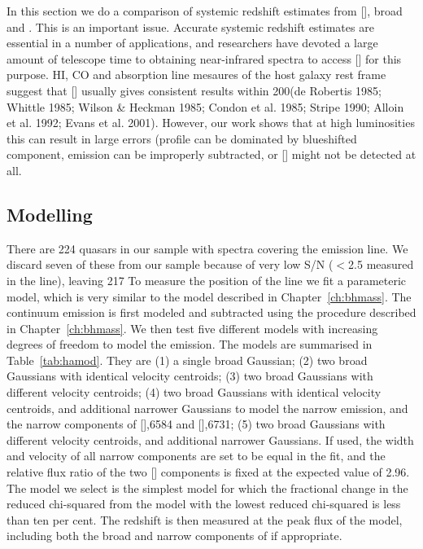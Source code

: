 In this section we do a comparison of systemic redshift estimates from [], broad \hb and \hans. 
This is an important issue. 
Accurate systemic redshift estimates are essential in a number of applications, and researchers have devoted a large amount of telescope time to obtaining near-infrared spectra to access [] for this purpose. 
HI, CO and absorption line mesaures of the host galaxy rest frame suggest that [] usually gives consistent results within 200\kms (de Robertis 1985; Whittle 1985; Wilson \& Heckman 1985; Condon et al. 1985; Stripe 1990; Alloin et al. 1992; Evans et al. 2001).  
However, our work shows that at high luminosities this can result in large errors (profile can be dominated by blueshifted component,  emission can be improperly subtracted, or [] might not be detected at all. 

\subsection{Modelling \hans}

There are 224 quasars in our sample with spectra covering the \ha emission line. 
We discard seven of these from our sample because of very low \ac{S/N} ($<$2.5 measured in the \ha line), leaving 217
To measure the position of the line we fit a parameteric model, which is very similar to the model described in Chapter~\ref{ch:bhmass}. 
The continuum emission is first modeled and subtracted using the procedure described in Chapter~\ref{ch:bhmass}. 
We then test five different models with increasing degrees of freedom to model the \ha emission. 
The models are summarised in Table~\ref{tab:hamod}. 
They are (1) a single broad Gaussian; (2) two broad Gaussians with identical velocity centroids; (3) two broad Gaussians with different velocity centroids; (4) two broad Gaussians with identical velocity centroids, and additional narrower Gaussians to model the narrow \ha emission, and the narrow components of [],6584 and [],6731; (5) two broad Gaussians with different velocity centroids, and additional narrower Gaussians. 
If used, the width and velocity of all narrow components are set to be equal in the fit, and the relative flux ratio of the two [] components is fixed at the expected value of 2.96.
The model we select is the simplest model for which the fractional change in the reduced chi-squared from the model with the lowest reduced chi-squared is less than ten per cent. 
The redshift is then measured at the peak flux of the \ha model, including both the broad and narrow components of \ha if appropriate. 

